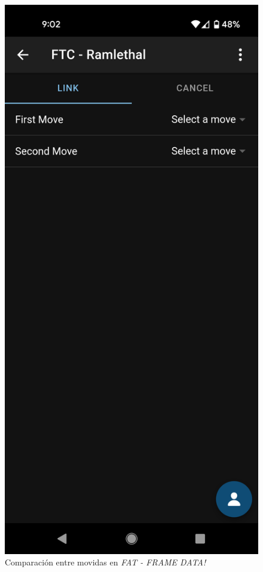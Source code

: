 \begin{figure}
    \centering
    \includegraphics[height=0.4\textheight]{figures/comparison.png}
    \caption{Comparación entre movidas en \textit{FAT - FRAME DATA!}}
    \label{fig: comparison}
\end{figure}

